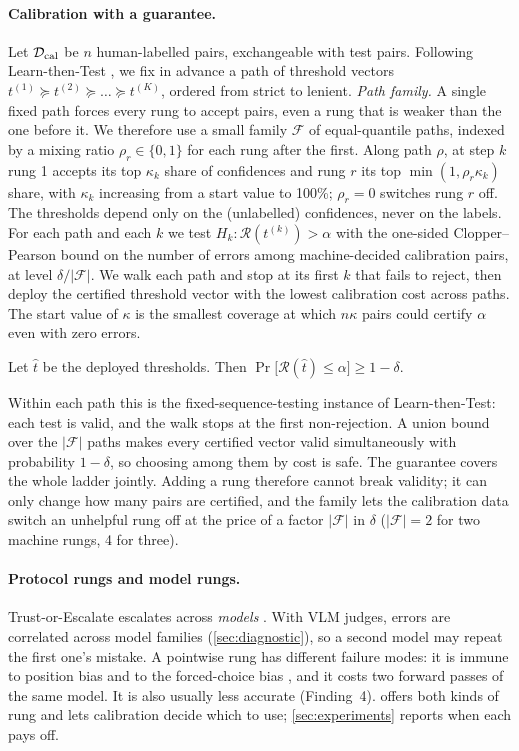 \paragraph{Calibration with a guarantee.}
Let $\mathcal D_{\rm cal}$ be $n$ human-labelled pairs, exchangeable with test pairs.
Following Learn-then-Test \citep{angelopoulos2021learn}, we fix in advance a path of threshold vectors $t^{(1)}\succeq t^{(2)}\succeq\dots\succeq t^{(K)}$, ordered from strict to lenient.
\emph{Path family.} A single fixed path forces every rung to accept pairs, even a rung that is weaker than the one before it. We therefore use a small family $\mathcal F$ of equal-quantile paths, indexed by a mixing ratio $\rho_r\in\{0,1\}$ for each rung after the first. Along path $\rho$, at step $k$ rung 1 accepts its top $\kappa_k$ share of confidences and rung $r$ its top $\min(1,\rho_r\kappa_k)$ share, with $\kappa_k$ increasing from a start value to 100\%; $\rho_r=0$ switches rung $r$ off. The thresholds depend only on the (unlabelled) confidences, never on the labels.
For each path and each $k$ we test $H_k:\mathcal R(t^{(k)})>\alpha$ with the one-sided Clopper--Pearson bound \citep{clopper1934use} on the number of errors among machine-decided calibration pairs, at level $\delta/|\mathcal F|$. We walk each path and stop at its first $k$ that fails to reject, then deploy the certified threshold vector with the lowest calibration cost across paths. The start value of $\kappa$ is the smallest coverage at which $n\kappa$ pairs could certify $\alpha$ even with zero errors.
\begin{proposition}\label{prop:ltt}
Let $\hat t$ be the deployed thresholds. Then $\Pr\big[\mathcal R(\hat t)\le\alpha\big]\ge1-\delta$.
\end{proposition}
\noindent Within each path this is the fixed-sequence-testing instance of Learn-then-Test: each test is valid, and the walk stops at the first non-rejection. A union bound over the $|\mathcal F|$ paths makes every certified vector valid simultaneously with probability $1-\delta$, so choosing among them by cost is safe.
The guarantee covers the whole ladder jointly. Adding a rung therefore cannot break validity; it can only change how many pairs are certified, and the family lets the calibration data switch an unhelpful rung off at the price of a factor $|\mathcal F|$ in $\delta$ ($|\mathcal F|=2$ for two machine rungs, 4 for three).

\paragraph{Protocol rungs and model rungs.}
Trust-or-Escalate escalates across \emph{models} \citep{jung2024trust}. With VLM judges, errors are correlated across model families (\cref{sec:diagnostic}), so a second model may repeat the first one's mistake. A pointwise rung has different failure modes: it is immune to position bias and to the forced-choice bias \citep{khan2026seeing}, and it costs two forward passes of the same model. It is also usually less accurate (Finding~4). \eaglev{} offers both kinds of rung and lets calibration decide which to use; \cref{sec:experiments} reports when each pays off.

